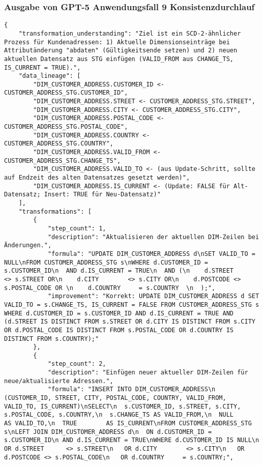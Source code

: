 \subsubsection{Ausgabe von GPT-5 Anwendungsfall 9 Konsistenzdurchlauf}\label{anhang:subsubsec:gpt_case9_prompt2}
\begin{lstlisting}[caption={Ausgabe: GPT-5 Anwendungsfall 9 Konsistenzdurchlauf},label={gpt_case9_prompt2}]
{
    "transformation_understanding": "Ziel ist ein SCD-2-ähnlicher Prozess für Kundenadressen: 1) Aktuelle Dimensionseinträge bei Attributänderung "abdaten" (Gültigkeitsende setzen) und 2) neuen aktuellen Datensatz aus STG einfügen (VALID_FROM aus CHANGE_TS, IS_CURRENT = TRUE).",
    "data_lineage": [
        "DIM_CUSTOMER_ADDRESS.CUSTOMER_ID <- CUSTOMER_ADDRESS_STG.CUSTOMER_ID",
        "DIM_CUSTOMER_ADDRESS.STREET <- CUSTOMER_ADDRESS_STG.STREET",
        "DIM_CUSTOMER_ADDRESS.CITY <- CUSTOMER_ADDRESS_STG.CITY",
        "DIM_CUSTOMER_ADDRESS.POSTAL_CODE <- CUSTOMER_ADDRESS_STG.POSTAL_CODE",
        "DIM_CUSTOMER_ADDRESS.COUNTRY <- CUSTOMER_ADDRESS_STG.COUNTRY",
        "DIM_CUSTOMER_ADDRESS.VALID_FROM <- CUSTOMER_ADDRESS_STG.CHANGE_TS",
        "DIM_CUSTOMER_ADDRESS.VALID_TO <- (aus Update-Schritt, sollte auf Endzeit des alten Datensatzes gesetzt werden)",
        "DIM_CUSTOMER_ADDRESS.IS_CURRENT <- (Update: FALSE für Alt-Datensatz; Insert: TRUE für Neu-Datensatz)"
    ],
    "transformations": [
        {
            "step_count": 1,
            "description": "Aktualisieren der aktuellen DIM-Zeilen bei Änderungen.",
            "formula": "UPDATE DIM_CUSTOMER_ADDRESS d\nSET VALID_TO = NULL\nFROM CUSTOMER_ADDRESS_STG s\nWHERE d.CUSTOMER_ID = s.CUSTOMER_ID\n  AND d.IS_CURRENT = TRUE\n  AND (\n    d.STREET      <> s.STREET OR\n    d.CITY        <> s.CITY OR\n    d.POSTCODE <> s.POSTAL_CODE OR \n    d.COUNTRY     = s.COUNTRY  \n  );",
            "improvement": "Korrekt: UPDATE DIM_CUSTOMER_ADDRESS d SET VALID_TO = s.CHANGE_TS, IS_CURRENT = FALSE FROM CUSTOMER_ADDRESS_STG s WHERE d.CUSTOMER_ID = s.CUSTOMER_ID AND d.IS_CURRENT = TRUE AND (d.STREET IS DISTINCT FROM s.STREET OR d.CITY IS DISTINCT FROM s.CITY OR d.POSTAL_CODE IS DISTINCT FROM s.POSTAL_CODE OR d.COUNTRY IS DISTINCT FROM s.COUNTRY);"
        },
        {
            "step_count": 2,
            "description": "Einfügen neuer aktueller DIM-Zeilen für neue/aktualisierte Adressen.",
            "formula": "INSERT INTO DIM_CUSTOMER_ADDRESS\n  (CUSTOMER_ID, STREET, CITY, POSTAL_CODE, COUNTRY, VALID_FROM, VALID_TO, IS_CURRENT)\nSELECT\n  s.CUSTOMER_ID, s.STREET, s.CITY, s.POSTAL_CODE, s.COUNTRY,\n  s.CHANGE_TS AS VALID_FROM,\n  NULL        AS VALID_TO,\n  TRUE        AS IS_CURRENT\nFROM CUSTOMER_ADDRESS_STG s\nLEFT JOIN DIM_CUSTOMER_ADDRESS d\n  ON d.CUSTOMER_ID = s.CUSTOMER_ID\n AND d.IS_CURRENT = TRUE\nWHERE d.CUSTOMER_ID IS NULL\n   OR d.STREET      <> s.STREET\n   OR d.CITY        <> s.CITY\n   OR d.POSTCODE <> s.POSTAL_CODE\n   OR d.COUNTRY     = s.COUNTRY;",

\end{lstlisting}
